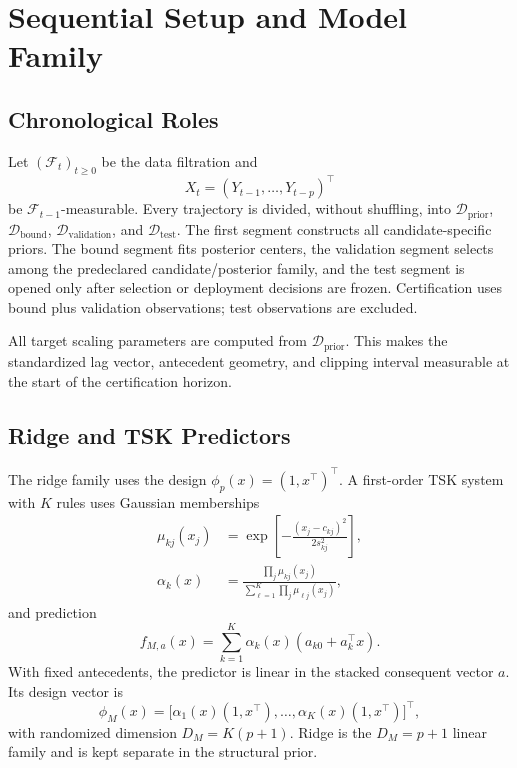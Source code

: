 \section{Sequential Setup and Model Family}
\label{sec:model}

\subsection{Chronological Roles}
Let $(\mathcal F_t)_{t\ge0}$ be the data filtration and
\begin{equation}
X_t=(Y_{t-1},\ldots,Y_{t-p})^\top
\label{eq:lag_vector}
\end{equation}
be $\mathcal F_{t-1}$-measurable. Every trajectory is divided, without shuffling, into
$\mathcal D_{\mathrm{prior}}$, $\mathcal D_{\mathrm{bound}}$, $\mathcal D_{\mathrm{validation}}$, and $\mathcal D_{\mathrm{test}}$.
The first segment constructs all candidate-specific priors. The bound segment fits posterior centers, the validation segment selects among the predeclared candidate/posterior family, and the test segment is opened only after selection or deployment decisions are frozen. Certification uses bound plus validation observations; test observations are excluded.

All target scaling parameters are computed from $\mathcal D_{\mathrm{prior}}$. This makes the standardized lag vector, antecedent geometry, and clipping interval measurable at the start of the certification horizon.

\subsection{Ridge and TSK Predictors}
The ridge family uses the design $\phi_{p}(x)=(1,x^\top)^\top$. A first-order TSK system with $K$ rules uses Gaussian memberships
\begin{align}
\mu_{kj}(x_j)&=\exp\!\left[-\frac{(x_j-c_{kj})^2}{2s_{kj}^2}\right],\\
\alpha_k(x)&=\frac{\prod_j\mu_{kj}(x_j)}{\sum_{\ell=1}^{K}\prod_j\mu_{\ell j}(x_j)},
\label{eq:memberships}
\end{align}
and prediction
\begin{equation}
f_{M,a}(x)=\sum_{k=1}^{K}\alpha_k(x)(a_{k0}+a_k^\top x).
\label{eq:tsk}
\end{equation}
With fixed antecedents, the predictor is linear in the stacked consequent vector $a$. Its design vector is
\begin{equation}
\phi_M(x)=\big[\alpha_1(x)(1,x^\top),\ldots,\alpha_K(x)(1,x^\top)\big]^\top,
\label{eq:design}
\end{equation}
with randomized dimension $D_M=K(p+1)$. Ridge is the $D_M=p+1$ linear family and is kept separate in the structural prior.

